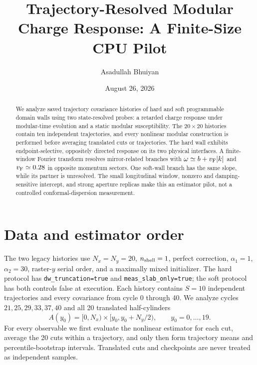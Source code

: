 \documentclass[aps,prx,twocolumn,superscriptaddress,nofootinbib,floatfix]{revtex4-2}
\newcommand{\code}[1]{\texttt{#1}}
\begin{document}
\title{Trajectory-Resolved Modular Charge Response: A Finite-Size CPU Pilot}
\author{Asadullah Bhuiyan}
\date{August 26, 2026}

\begin{abstract}
We analyze saved trajectory covariance histories of hard and soft programmable domain
walls using two state-resolved probes: a retarded charge response under modular-time
evolution and a static modular susceptibility.  The $20\times20$ histories contain ten
independent trajectories, and every nonlinear modular construction is performed before
averaging translated cuts or trajectories.  The hard wall exhibits endpoint-selective,
oppositely directed response on its two physical interfaces.  A finite-window Fourier
transform resolves mirror-related branches with $\omega\simeq b+v_{\rm F}|k|$ and
$v_{\rm F}\simeq0.28$ in opposite momentum sectors.  One soft-wall branch has the same
slope, while its partner is unresolved.  The small longitudinal window, nonzero and
damping-sensitive intercept, and strong aperture replicas make this an estimator pilot,
not a controlled conformal-dispersion measurement.
\end{abstract}

\maketitle

\section{Data and estimator order}

The two legacy histories use $N_x=N_y=20$, $n_{\rm shell}=1$, perfect correction,
$\alpha_1=1$, $\alpha_2=30$, raster-$y$ serial order, and a maximally mixed initializer.
The hard protocol has \code{dw\_truncation=true} and
\code{meas\_slab\_only=true}; the soft protocol has both controls false at execution.
Each history contains $S=10$ independent trajectories and every covariance from cycle
$0$ through 40.  We analyze cycles $21,25,29,33,37,40$ and all 20 translated
half-cylinders
\begin{equation}
 A(y_0)=[0,N_x)\times[y_0,y_0+N_y/2),\qquad y_0=0,\ldots,19.
\end{equation}
For every observable we first evaluate the nonlinear estimator for each cut, average the
20 cuts within a trajectory, and only then form trajectory means and percentile-bootstrap
intervals.  Translated cuts and checkpoints are never treated as independent samples.
\end{document}
